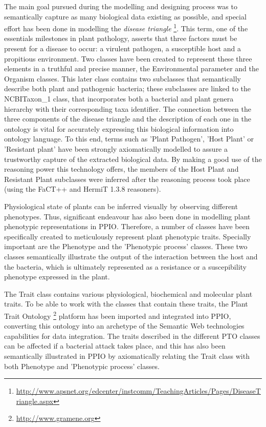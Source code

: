 \documentclass[sw]{iosart2c}
\newcommand{\myurl}[1]{\footnote{\url{#1}}}
\begin{document}
The main goal pursued during the modelling and designing process was to semantically capture as many biological data existing as possible, and special effort has been done in modelling the {\itshape disease triangle} \myurl{http://www.apsnet.org/edcenter/instcomm/TeachingArticles/Pages/DiseaseTriangle.aspx}. This term, one of the essentials milestones in plant pathology, asserts that three factors must be present for a disease to occur: a virulent pathogen, a susceptible host and a propitious environment. Two classes have been created to represent these three elements in a truthful and precise manner, the {\sf Environmental parameter} and the {\sf Organism} classes. This later class contains two subclasses that semantically describe both plant and pathogenic bacteria; these subclasses are linked to the {\sf NCBITaxon\_1} class, that incorporates both a bacterial and plant genera hierarchy with their corresponding taxa identifier. The connection between the three components of the disease triangle and the description of each one in the ontology is vital for accurately expressing this biological information into ontology language. To this end, terms such as {\sf 'Plant Pathogen'}, {\sf 'Host Plant'} or { \sf 'Resistant plant'} have been strongly axiomatically modelled to assure a trustworthy capture of the extracted biological data. By making a good use of the reasoning power this technology offers, the members of the {\sf Host Plant} and {\sf Resistant Plant} subclasses were inferred after the reasoning process took place (using the FaCT++ and HermiT 1.3.8 reasoners).

Physiological state of plants can be inferred visually by observing different phenotypes. Thus, significant endeavour has also been done in modelling plant phenotypic representations in PPIO. Therefore, a number of classes have been specifically created to meticulously represent plant phenotypic traits. Specially important are the {\sf Phenotype} and the {\sf 'Phenotypic process'} classes. These two classes semantically illustrate the output of the interaction between the host and the bacteria, which is ultimately represented as a resistance or a suscepibility phenotype expressed in the plant.
 
The {\sf Trait} class contains various physiological, biochemical and molecular plant traits. To be able to work with the classes that contain these traits, the Plant Trait Ontology \myurl{http://www.gramene.org} platform \cite{PTO} has been imported and integrated into PPIO, converting this ontology into an archetype of the Semantic Web technologies capabilities for data integration. The traits described in the different PTO classes can be affected if a bacterial attack takes place, and this has also been semantically illustrated in PPIO by axiomatically relating the {\sf Trait} class with both {\sf Phenotype} and {\sf 'Phenotypic process'} classes.
\end{document}
